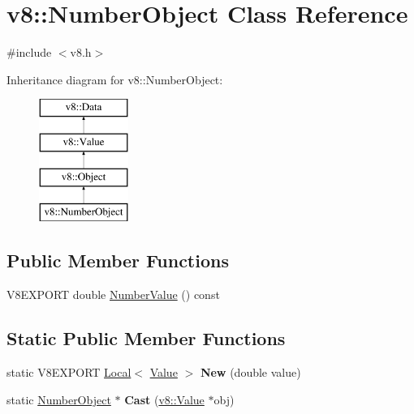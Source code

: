 \hypertarget{classv8_1_1_number_object}{}\section{v8\+:\+:Number\+Object Class Reference}
\label{classv8_1_1_number_object}


{\ttfamily \#include $<$v8.\+h$>$}

Inheritance diagram for v8\+:\+:Number\+Object\+:\begin{figure}[H]
\begin{center}
\leavevmode
\includegraphics[height=4.000000cm]{classv8_1_1_number_object}
\end{center}
\end{figure}
\subsection*{Public Member Functions}
\begin{DoxyCompactItemize}
\item 
V8\+E\+X\+P\+O\+R\+T double \hyperlink{classv8_1_1_number_object_a438a78ac8282978aae0acc805ca5e13c}{Number\+Value} () const 
\end{DoxyCompactItemize}
\subsection*{Static Public Member Functions}
\begin{DoxyCompactItemize}
\item 
\hypertarget{classv8_1_1_number_object_a70318ca87da57df8e1a26a1e486cf7fd}{}static V8\+E\+X\+P\+O\+R\+T \hyperlink{classv8_1_1_local}{Local}$<$ \hyperlink{classv8_1_1_value}{Value} $>$ {\bfseries New} (double value)\label{classv8_1_1_number_object_a70318ca87da57df8e1a26a1e486cf7fd}

\item 
\hypertarget{classv8_1_1_number_object_a0dad558fde0ec8e51ff53a3e34dbce7e}{}static \hyperlink{classv8_1_1_number_object}{Number\+Object} $\ast$ {\bfseries Cast} (\hyperlink{classv8_1_1_value}{v8\+::\+Value} $\ast$obj)\label{classv8_1_1_number_object_a0dad558fde0ec8e51ff53a3e34dbce7e}

\end{DoxyCompactItemize}


